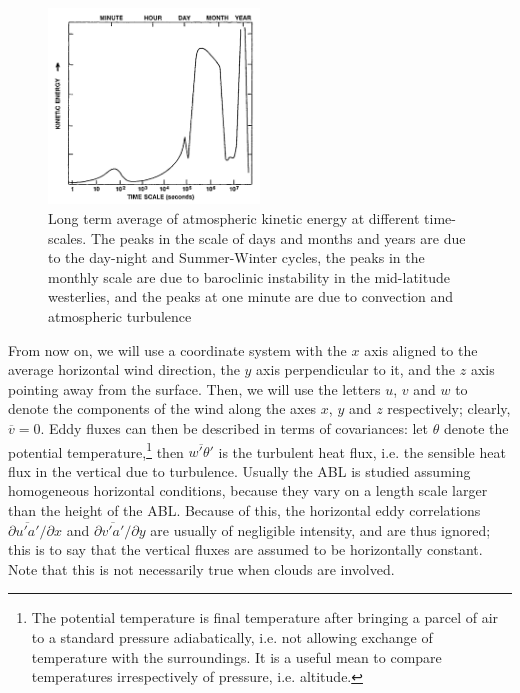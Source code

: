 \documentclass[a4paper,11pt]{kth-mag}
\begin{document}
\begin{figure}
\caption{Long term average of atmospheric kinetic energy at different time-scales. The peaks in the scale of days and months and years are due to the day-night and Summer-Winter cycles, the peaks in the monthly scale are due to baroclinic instability in the mid-latitude westerlies, and the peaks at one minute are due to convection and atmospheric turbulence \citep{tkespectrumsrc,tkespectrumorig}}
\label{fig:tkespectrum}
\centering
\includegraphics[width=0.5\textwidth]{images/kinetic_energy_spectrum}
\end{figure}

From now on, we will use a coordinate system with the $x$ axis aligned to the average horizontal wind direction, the $y$ axis perpendicular to it, and the $z$ axis pointing away from the surface. Then, we will use the letters $u$, $v$ and $w$ to denote the components of the wind along the axes $x$, $y$ and $z$ respectively; clearly, $\overline{v}=0$. Eddy fluxes can then be described in terms of covariances: let $\theta$ denote the potential temperature,\footnote{The potential temperature is final temperature after bringing a parcel of air to a standard pressure adiabatically, i.e. not allowing exchange of temperature with the surroundings. It is a useful mean to compare temperatures irrespectively of pressure, i.e. altitude.} then $\overline{w'\theta'}$ is the turbulent heat flux, i.e. the sensible heat flux in the vertical due to turbulence. Usually the ABL is studied assuming homogeneous horizontal conditions, because they vary on a length scale larger than the height of the ABL. Because of this, the horizontal eddy correlations $\partial\overline{u'a'}/\partial x$ and $\partial\overline{v'a'}/\partial y$ are usually of negligible intensity, and are thus ignored; this is to say that the vertical fluxes are assumed to be horizontally constant. Note that this is not necessarily true when clouds are involved.
\end{document}
